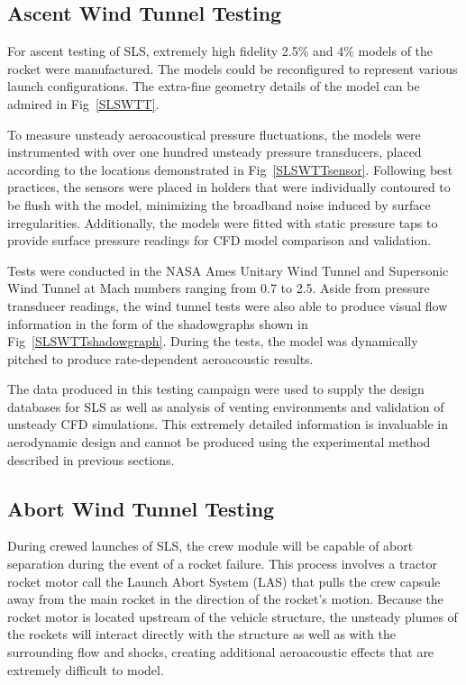 \documentclass[]{aiaa-tc}%
\begin{document}
\subsection{Ascent Wind Tunnel Testing}

For ascent testing of SLS, extremely high fidelity 2.5\% and 4\% models of the rocket were manufactured.  The models could be reconfigured to represent various launch configurations.  The extra-fine geometry details of the model can be admired in Fig~\ref{SLSWTT}.

To measure unsteady aeroacoustical pressure fluctuations, the models were instrumented with over one hundred unsteady pressure transducers, placed according to the locations demonstrated in Fig~\ref{SLSWTTsensor}.  Following best practices, the sensors were placed in holders that were individually contoured to be flush with the model, minimizing the broadband noise induced by surface irregularities.  Additionally, the models were fitted with static pressure taps to provide surface pressure readings for CFD model comparison and validation.

Tests were conducted in the NASA Ames Unitary Wind Tunnel and Supersonic Wind Tunnel at Mach numbers ranging from 0.7 to 2.5.  Aside from pressure transducer readings, the wind tunnel tests were also able to produce visual flow information in the form of the shadowgraphs shown in Fig~\ref{SLSWTTshadowgraph}.  During the tests, the model was dynamically pitched to produce rate-dependent aeroacoustic results.

The data produced in this testing campaign were used to supply the design databases for SLS as well as analysis of venting environments and validation of unsteady CFD simulations.  This extremely detailed information is invaluable in aerodynamic design and cannot be produced using the experimental method described in previous sections.

\subsection{Abort Wind Tunnel Testing}

During crewed launches of SLS, the crew module will be capable of abort separation during the event of a rocket failure.  This process involves a tractor rocket motor call the Launch Abort System (LAS) that pulls the crew capsule away from the main rocket in the direction of the rocket's motion.  Because the rocket motor is located upstream of the vehicle structure, the unsteady plumes of the rockets will interact directly with the structure as well as with the surrounding flow and shocks, creating additional aeroacoustic effects that are extremely difficult to model.
\end{document}
